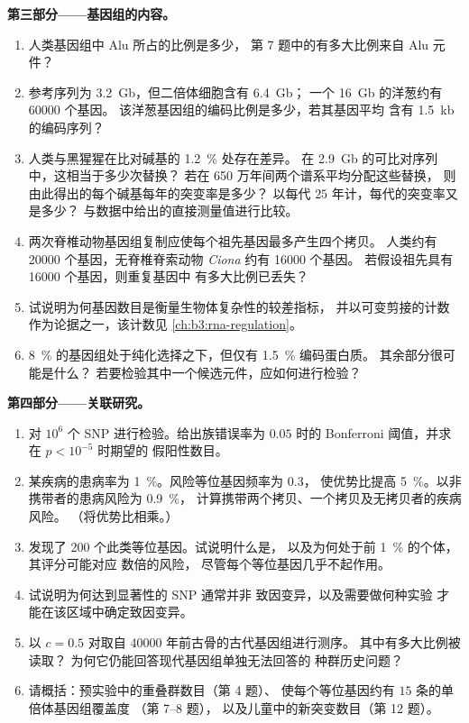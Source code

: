\begin{problem}
\medskip
\noindent\textbf{第三部分——基因组的内容。}
\begin{enumerate}[resume]
  \item 人类基因组中 Alu 所占的比例是多少，
        第 7 题中的有多大比例来自 Alu 元件？
  \item 参考序列为 \qty{3.2}{Gb}，但二倍体细胞含有 \qty{6.4}{Gb}；
        一个 \qty{16}{Gb} 的洋葱约有 \num{60000} 个基因。
        该洋葱基因组的编码比例是多少，若其基因平均
        含有 \qty{1.5}{kb} 的编码序列？
  \item 人类与黑猩猩在比对碱基的 \qty{1.2}{\%} 处存在差异。
        在 \qty{2.9}{Gb} 的可比对序列中，这相当于多少次替换？
        若在 650 万年间两个谱系平均分配这些替换，
        则由此得出的每个碱基每年的突变率是多少？
        以每代 $25$ 年计，每代的突变率又是多少？
        与数据中给出的直接测量值进行比较。
  \item 两次脊椎动物基因组复制应使每个祖先基因最多产生四个拷贝。
        人类约有 \num{20000} 个基因，无脊椎脊索动物
        \emph{Ciona} 约有 \num{16000} 个基因。
        若假设祖先具有 \num{16000} 个基因，则重复基因中
        有多大比例已丢失？
  \item 试说明为何基因数目是衡量生物体复杂性的较差指标，
        并以可变剪接的计数作为论据之一，该计数见
        \cref{ch:b3:rna-regulation}。
  \item \qty{8}{\%} 的基因组处于纯化选择之下，但仅有 \qty{1.5}{\%} 编码蛋白质。
        其余部分很可能是什么？
        若要检验其中一个候选元件，应如何进行检验？
\end{enumerate}

\medskip
\noindent\textbf{第四部分——关联研究。}
\begin{enumerate}[resume]
  \item 对 $10^{6}$ 个 SNP 进行检验。给出族错误率为 $0.05$ 时的
        Bonferroni 阈值，并求在 $p < 10^{-5}$ 时期望的
        假阳性数目。
  \item 某疾病的患病率为 \qty{1}{\%}。风险等位基因频率为 $0.3$，
        使优势比提高 \qty{5}{\%}。以非携带者的患病风险为 \qty{0.9}{\%}，
        计算携带两个拷贝、一个拷贝及无拷贝者的疾病风险。
        （将优势比相乘。）
  \item 发现了 200 个此类等位基因。试说明什么是，
        以及为何处于前 \qty{1}{\%} 的个体，其评分可能对应
        数倍的风险，
        尽管每个等位基因几乎不起作用。
  \item 试说明为何达到显著性的 SNP 通常并非
        致因变异，以及需要做何种实验
        才能在该区域中确定致因变异。
  \item 以 $c = 0.5$ 对取自 \num{40000} 年前古骨的古代基因组进行测序。
        其中有多大比例被读取？
        为何它仍能回答现代基因组单独无法回答的
        种群历史问题？
  \item 请概括：预实验中的重叠群数目（第 4 题）、
        使每个等位基因约有 $15$ 条的单倍体基因组覆盖度
        （第 7--8 题），
        以及儿童中的新突变数目（第 12 题）。
\end{enumerate}
\end{problem}
